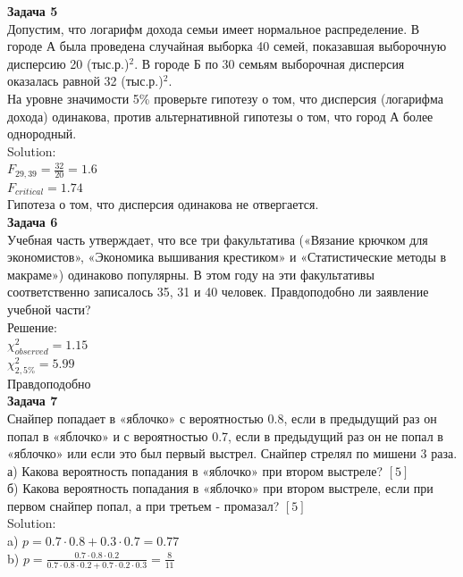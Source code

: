\documentclass[12pt, a4paper]{article}\usepackage[]{graphicx}\usepackage[]{color}
\begin{document}
\textbf{Задача 5} \\ %
Допустим, что логарифм дохода семьи имеет нормальное распределение. В городе А была проведена случайная выборка 40 семей, показавшая выборочную дисперсию 20 (тыс.р.)$^{2}$. В городе Б по 30 семьям выборочная дисперсия оказалась равной 32 (тыс.р.)$^{2}$. \\
На уровне значимости 5\% проверьте гипотезу о том, что дисперсия (логарифма дохода) одинакова, против альтернативной гипотезы о том, что город А более однородный. \\
Solution: \\
$F_{29,39}=\frac{32}{20}=1.6$ \\
$F_{critical}=1.74$ \\
Гипотеза о том, что дисперсия одинакова не отвергается. \\

\textbf{Задача 6} \\ %
Учебная часть утверждает, что все три факультатива («Вязание крючком для экономистов», «Экономика вышивания крестиком» и «Статистические методы в макраме») одинаково популярны. В этом году на эти факультативы соответственно записалось 35, 31 и 40 человек. Правдоподобно ли заявление учебной части? \\
Решение: \\
$\chi^{2}_{observed}=1.15$ \\
$\chi^{2}_{2,5\%}=5.99$ \\
Правдоподобно \\

\textbf{Задача 7} \\ %
Снайпер попадает в «яблочко» с вероятностью 0.8, если в предыдущий раз он попал в «яблочко» и с вероятностью 0.7, если в предыдущий раз он не попал в «яблочко» или если это был первый выстрел. Снайпер стрелял по мишени 3 раза. \\
а) Какова вероятность попадания в «яблочко» при втором выстреле? $[5]$ \\
б) Какова вероятность попадания в «яблочко» при втором выстреле, если при первом снайпер попал, а при третьем - промазал? $[5]$ \\
Solution: \\
a) $p=0.7\cdot 0.8+ 0.3\cdot 0.7=0.77$ \\
b) $p=\frac{0.7\cdot0.8\cdot0.2}{0.7\cdot 0.8\cdot 0.2 + 0.7\cdot 0.2 \cdot 0.3}=\frac{8}{11}$ \\
\end{document}
